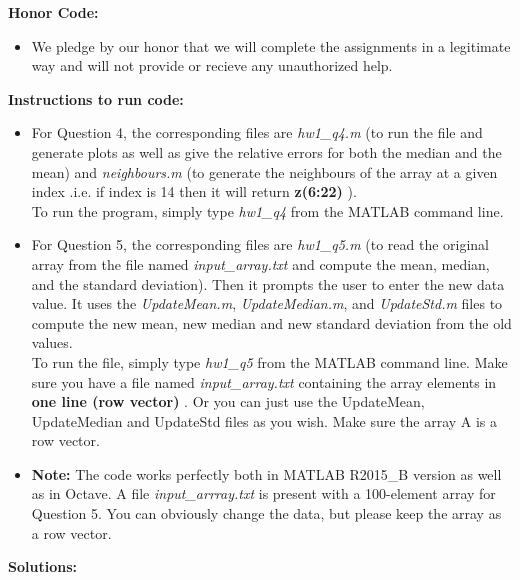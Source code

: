 \documentclass[11pt]{article}
\begin{document}
\maketitle
\newpage
{}

\textbf{Honor Code:} 
\begin{itemize}
\item We pledge by our honor that we will complete the assignments in a legitimate way and will not provide or recieve any unauthorized help. 
\end{itemize}
\vspace{5mm}
\textbf{Instructions to run code: }
\begin{itemize}
	\item {
		For Question 4, the corresponding files are \textit{hw1\_q4.m} (to run the file and generate plots as well as give the relative errors for both the median and the mean) and \textit{neighbours.m} (to generate the neighbours of the array at a given index .i.e. if index is 14 then it will return \textbf{z(6:22)} ). \\
		To run the program, simply type \textit{hw1\_q4} from the MATLAB command line.
	} 
	\item {
		For Question 5, the corresponding files are \textit{hw1\_q5.m} (to read the original array from the file named \textit{input\_array.txt} and compute the mean, median, and the standard deviation). Then it prompts the user to enter the new data value. It uses the \textit{UpdateMean.m}, \textit{UpdateMedian.m}, and \textit{UpdateStd.m} files to compute the new mean, new median and new standard deviation from the old values. \\
		To run the file, simply type \textit{hw1\_q5} from the MATLAB command line. Make sure you have a file named \textit{input\_array.txt} containing the array elements in \textbf{one line (row vector)} .
		Or you can just use the UpdateMean, UpdateMedian and UpdateStd files as you wish. Make sure the array A is a row vector.
	}
	\item {
		\textbf{Note:} The code works perfectly both in MATLAB R2015\_B version as well as in Octave. A file \textit{input\_arrray.txt} is present with a 100-element array for Question 5. You can obviously change the data, but please keep the array as a row vector.
	} 
\end{itemize}
\textbf{Solutions: }
\end{document}
